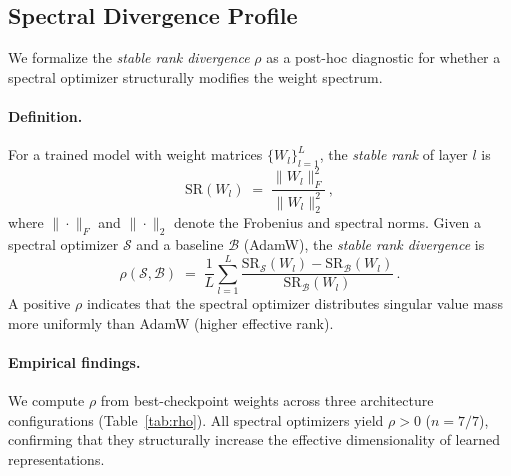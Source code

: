 \subsection{Spectral Divergence Profile}
\label{app:spectral-divergence}

We formalize the \emph{stable rank divergence} $\rho$ as a post-hoc diagnostic
for whether a spectral optimizer structurally modifies the weight spectrum.

\paragraph{Definition.}
For a trained model with weight matrices $\{W_l\}_{l=1}^L$, the \emph{stable rank} of layer $l$ is
\begin{equation}
  \mathrm{SR}(W_l) \;=\; \frac{\|W_l\|_F^2}{\|W_l\|_2^2}\,,
\end{equation}
where $\|\cdot\|_F$ and $\|\cdot\|_2$ denote the Frobenius and spectral norms.
Given a spectral optimizer $\mathcal{S}$ and a baseline $\mathcal{B}$ (AdamW), the
\emph{stable rank divergence} is
\begin{equation}
  \rho(\mathcal{S}, \mathcal{B}) \;=\; \frac{1}{L}\sum_{l=1}^{L}
    \frac{\mathrm{SR}_{\mathcal{S}}(W_l) - \mathrm{SR}_{\mathcal{B}}(W_l)}
         {\mathrm{SR}_{\mathcal{B}}(W_l)}\,.
  \label{eq:rho}
\end{equation}
A positive $\rho$ indicates that the spectral optimizer distributes singular value
mass more uniformly than AdamW (higher effective rank).

\paragraph{Empirical findings.}
We compute $\rho$ from best-checkpoint weights across three architecture configurations
(Table~\ref{tab:rho}).
All spectral optimizers yield $\rho > 0$ ($n=7/7$), confirming that they
structurally increase the effective dimensionality of learned representations.

